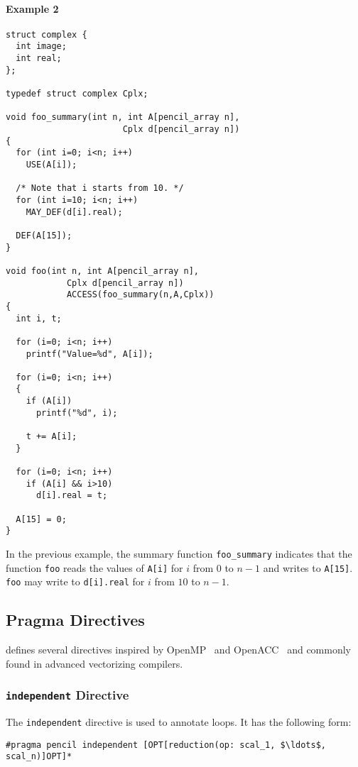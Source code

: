 \paragraph{Example 2}
  \begin{lstlisting}[language=pencil]
struct complex {
  int image;
  int real;
};

typedef struct complex Cplx;

void foo_summary(int n, int A[pencil_array n],
                       Cplx d[pencil_array n])
{
  for (int i=0; i<n; i++)
    USE(A[i]);

  /* Note that i starts from 10. */
  for (int i=10; i<n; i++)
    MAY_DEF(d[i].real);

  DEF(A[15]);
}

void foo(int n, int A[pencil_array n],
            Cplx d[pencil_array n])
            ACCESS(foo_summary(n,A,Cplx))
{
  int i, t;

  for (i=0; i<n; i++)
    printf("Value=%d", A[i]);

  for (i=0; i<n; i++)
  {
    if (A[i])
      printf("%d", i);

    t += A[i];
  }

  for (i=0; i<n; i++)
    if (A[i] && i>10)
      d[i].real = t;

  A[15] = 0;
}
  \end{lstlisting}

  In the previous example, the summary function
  \lstinline!foo_summary!  indicates that the function
  \lstinline!foo! reads the values of \lstinline!A[i]!  for $i$
  from $0$ to $n-1$ and writes to \lstinline!A[15]!.
  \lstinline!foo! may write to \lstinline!d[i].real! for $i$
  from $10$ to $n-1$. 

\subsection{Pragma Directives\label{sec:directives}}

\pencil defines several directives inspired by OpenMP~\cite{openmp08} and OpenACC~\cite{openacc11}
and commonly found in advanced vectorizing compilers.

\subsubsection{\texttt{independent} Directive\label{sec:independent}}


The \lstinline!independent! directive is used to annotate loops.
It has the following form:
\begin{lstlisting}[language=pencil]
#pragma pencil independent [OPT[reduction(op: scal_1, $\ldots$, scal_n)]OPT]*
\end{lstlisting}


